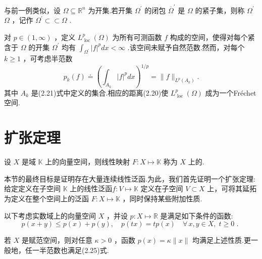 \begin{instance}
与前一例类似，设 $\Omega  \subseteq  {\mathbb{R}}^{n}$ 为开集.若开集 ${\Omega }^{\prime }$ 的闭包 ${\overline{\Omega }}^{\prime }$ 是 $\Omega$ 的紧子集，则称 ${\Omega }^{\prime }$  $\Omega$ ，记作 ${\Omega }^{\prime } \subset   \subset  \Omega$ .\par
对 $p \in  (1,\infty)$ ，定义 ${L}_{\text{ loc }}^{p}\left( \Omega \right)$ 为所有可测函数 $f$ 构成的空间，使得对每个紧含于 $\Omega$ 的开集 ${\Omega }^{\prime }$ 均有 ${\int }_{{\Omega }^{\prime }}{\left| f\right| }^{p}{dx} < \infty$ .该空间未赋予自然范数.然而，对每个 $k \geq  1$ ，可考虑半范数
\begin{equation}\tag{2.24}
{p}_{k}\left( f\right)  \doteq  {\left( {\int }_{{A}_{k}}{\left| f\right| }^{p}dx\right) }^{1/p} = \| f{\| }_{{L}^{p}\left( {A}_{k}\right) }.
\end{equation}
其中 ${A}_{k}$ 是(2.21)式中定义的集合.相应的距离(2.20)使 ${L}_{\text{ loc }}^{p}\left( \Omega \right)$ 成为一个Fréchet空间.
\end{instance}

\section{扩张定理}

\begin{definition}[线性泛函]
    设 $X$ 是域 $\mathbb{K}$ 上的向量空间，则线性映射 $F : X \mapsto  \mathbb{K}$ 称为 $X$ 上的.
\end{definition}
本节的最终目标是证明存在大量连续线性泛函.为此，我们首先证明一个扩张定理:给定定义在子空间 $\mathbb{K}$ 上的线性泛函$f : V \mapsto  \mathbb{K}$ 定义在子空间 $V \subset  X$ 上，可将其延拓为定义在整个空间上的泛函 $F : X \mapsto  \mathbb{K}$ ，同时保持某些附加性质.

以下考虑实数域上的向量空间 $X$ ，并设 $p : X \mapsto  \mathbb{R}$ 是满足如下条件的函数:
\begin{equation}\tag{2.25}
p\left( {x + y}\right)  \leq  p\left( x\right)  + p\left( y\right) ,\quad p\left( {tx}\right)  = {tp}\left( x\right) \quad \forall\,x,y \in  X,\;t \geq  0\text{ . }
\end{equation}

\begin{remark}
若 $X$ 是赋范空间，则对任意 $\kappa  > 0$ ，函数 $p\left( x\right)  = \kappa \| x\|$ 均满足上述性质.更一般地，任一半范数也满足(2.25)式.
\end{remark}


